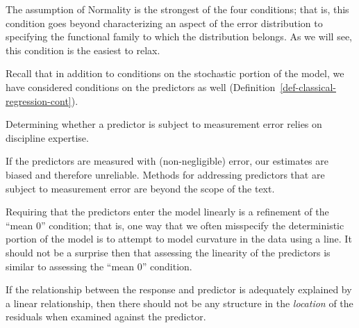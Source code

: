 \documentclass[
  letterpaper,
  DIV=11,
  numbers=noendperiod]{scrreprt}
\theoremstyle{definition}
\theoremstyle{definition}
\theoremstyle{remark}
\begin{document}
The assumption of Normality is the strongest of the four conditions;
that is, this condition goes beyond characterizing an aspect of the
error distribution to specifying the functional family to which the
distribution belongs. As we will see, this condition is the easiest to
relax.

Recall that in addition to conditions on the stochastic portion of the
model, we have considered conditions on the predictors as well
(Definition~\ref{def-classical-regression-cont}).

\begin{tcolorbox}[enhanced jigsaw, bottomrule=.15mm, titlerule=0mm, bottomtitle=1mm, colback=white, coltitle=black, rightrule=.15mm, leftrule=.75mm, toprule=.15mm, toptitle=1mm, left=2mm, opacityback=0, colframe=quarto-callout-note-color-frame, breakable, title=\textcolor{quarto-callout-note-color}{\faInfo}\hspace{0.5em}{Assessing Measurement Error in the Predictors}, arc=.35mm, colbacktitle=quarto-callout-note-color!10!white, opacitybacktitle=0.6]

Determining whether a predictor is subject to measurement error relies
on discipline expertise.

\end{tcolorbox}

If the predictors are measured with (non-negligible) error, our
estimates are biased and therefore unreliable. Methods for addressing
predictors that are subject to measurement error are beyond the scope of
the text.

Requiring that the predictors enter the model linearly is a refinement
of the ``mean 0'' condition; that is, one way that we often misspecify
the deterministic portion of the model is to attempt to model curvature
in the data using a line. It should not be a surprise then that
assessing the linearity of the predictors is similar to assessing the
``mean 0'' condition.

\begin{tcolorbox}[enhanced jigsaw, bottomrule=.15mm, titlerule=0mm, bottomtitle=1mm, colback=white, coltitle=black, rightrule=.15mm, leftrule=.75mm, toprule=.15mm, toptitle=1mm, left=2mm, opacityback=0, colframe=quarto-callout-note-color-frame, breakable, title=\textcolor{quarto-callout-note-color}{\faInfo}\hspace{0.5em}{Assessing Linearity of the Predictors}, arc=.35mm, colbacktitle=quarto-callout-note-color!10!white, opacitybacktitle=0.6]

If the relationship between the response and predictor is adequately
explained by a linear relationship, then there should not be any
structure in the \emph{location} of the residuals when examined against
the predictor.

\end{tcolorbox}
\end{document}
